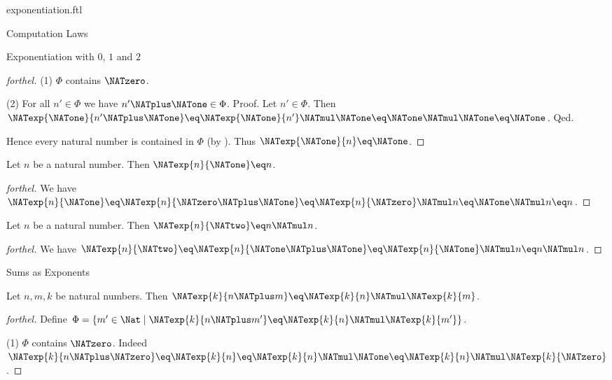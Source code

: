 \documentclass{naproche-library}
\begin{document}
\begin{smodule}[title=Exponentiation]{exponentiation.ftl}
\begin{sfragment}{Computation Laws}
\begin{sfragment}{Exponentiation with $0$, $1$ and $2$}
\begin{proof}[forthel]
      (1) $\Phi$ contains $\NATzero$.

      (2) For all $n' \in \Phi$ we have $n' \NATplus \NATone \in \Phi$. \newline
      Proof.
        Let $n' \in \Phi$.
        Then $\NATexp{\NATone}{n' \NATplus \NATone}
          \eq \NATexp{\NATone}{n'} \NATmul \NATone
          \eq \NATone \NATmul \NATone
          \eq \NATone$.
      Qed.

      Hence every natural number is contained in $\Phi$ (by ).
      Thus $\NATexp{\NATone}{n} \eq \NATone$.
    \end{proof}

    \begin{proposition}[forthel,id=ARITHMETIC_09_4975279749464064]
      Let $n$ be a natural number.
      Then $\NATexp{n}{\NATone} \eq n$.
    \end{proposition}
    \begin{proof}[forthel]
      We have $\NATexp{n}{\NATone}
        \eq \NATexp{n}{\NATzero \NATplus \NATone}
        \eq \NATexp{n}{\NATzero} \NATmul n
        \eq \NATone \NATmul n
        \eq n$.
    \end{proof}

    \begin{proposition}[forthel,id=ARITHMETIC_09_8513812055457792]
      Let $n$ be a natural number.
      Then $\NATexp{n}{\NATtwo} \eq n \NATmul n$.
    \end{proposition}
    \begin{proof}[forthel]
      We have $\NATexp{n}{\NATtwo}
        \eq \NATexp{n}{\NATone \NATplus \NATone}
        \eq \NATexp{n}{\NATone} \NATmul n
        \eq n \NATmul n$.
    \end{proof}
  \end{sfragment}

  \begin{sfragment}{Sums as Exponents}
    \begin{proposition}[forthel,id=ARITHMETIC_09_8152207530655744]
      Let $n, m, k$ be natural numbers.
      Then $\NATexp{k}{n \NATplus m} \eq \NATexp{k}{n} \NATmul \NATexp{k}{m}$.
    \end{proposition}
    \begin{proof}[forthel]
      Define $\Phi = \{ m' \in \Nat \mid \NATexp{k}{n \NATplus m'} \eq \NATexp{k}{n} \NATmul \NATexp{k}{m'} \}$.

      (1) $\Phi$ contains $\NATzero$. \newline
      Indeed $\NATexp{k}{n \NATplus \NATzero}
        \eq \NATexp{k}{n}
        \eq \NATexp{k}{n} \NATmul \NATone
        \eq \NATexp{k}{n} \NATmul \NATexp{k}{\NATzero}$.


\end{proof}
\end{sfragment}
\end{sfragment}
\end{smodule}
\end{document}
